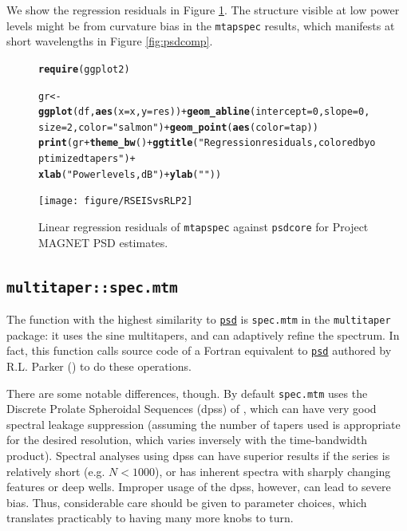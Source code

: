 \documentclass{article}\usepackage{graphicx, color}
\makeatletter
\newcommand{\hlfunctioncall}[1]{\textcolor[rgb]{0.501960784313725,0,0.329411764705882}{\textbf{#1}}}%
\newcommand{\hlstring}[1]{\textcolor[rgb]{0.6,0.6,1}{#1}}%
\newenvironment{kframe}{%
 \def\at@end@of@kframe{}%
 \ifinner\ifhmode%
  \def\at@end@of@kframe{\end{minipage}}%
  \begin{minipage}{\columnwidth}%
 \fi\fi%
 \def\FrameCommand##1{\hskip\@totalleftmargin \hskip-\fboxsep
 \colorbox{shadecolor}{##1}\hskip-\fboxsep
     \hskip-\linewidth \hskip-\@totalleftmargin \hskip\columnwidth}%
 \MakeFramed {\advance\hsize-\width
   \@totalleftmargin\z@ \linewidth\hsize
   \@setminipage}}%
 {\par\unskip\endMakeFramed%
 \at@end@of@kframe}
\newenvironment{knitrout}{}{} %
\newcommand{\Rcmd}[1]{\texttt{#1}}
\newcommand{\psd}[0]{\href{http://abarbour.github.com/psd/}{\color{blue}\Rcmd{psd}}}
\makeatother
\begin{document}
We show the regression residuals in Figure \ref{fig:psdreg}.  
The structure visible
at low power levels might be from curvature bias in
the \Rcmd{mtapspec} results, which
manifests at short wavelengths
in Figure \ref{fig:psdcomp}.

\begin{figure}[htb!]
\begin{center}
\begin{knitrout}
\color{fgcolor}\begin{kframe}
\begin{alltt}
\hlfunctioncall{require}(ggplot2)
\end{alltt}


{\ttfamily\noindent\itshape\color{messagecolor}{\#\# Loading required package: ggplot2}}\begin{alltt}
gr <- \hlfunctioncall{ggplot}(df, \hlfunctioncall{aes}(x = x, y = res)) + \hlfunctioncall{geom_abline}(intercept = 0, slope = 0, 
    size = 2, color = \hlstring{"salmon"}) + \hlfunctioncall{geom_point}(\hlfunctioncall{aes}(color = tap))
\hlfunctioncall{print}(gr + \hlfunctioncall{theme_bw}() + \hlfunctioncall{ggtitle}(\hlstring{"Regression residuals, colored by optimized tapers"}) + 
    \hlfunctioncall{xlab}(\hlstring{"Power levels, dB"}) + \hlfunctioncall{ylab}(\hlstring{""}))
\end{alltt}
\end{kframe}
\texttt{[image: figure/RSEISvsRLP2]} 

\end{knitrout}

\caption{Linear regression residuals of
\Rcmd{mtapspec} against \Rcmd{psdcore} for Project MAGNET PSD estimates.}
\label{fig:psdreg}
\end{center}
\end{figure}

\subsection{\Rcmd{multitaper::spec.mtm}}
The function with the highest similarity to \psd{} is
\Rcmd{spec.mtm} in the \Rcmd{multitaper} package: it uses
the sine multitapers, and can adaptively refine the spectrum.
In fact, this function
calls source code of a Fortran equivalent to \psd{}
authored by R.L. Parker (\citeyear{parkerweb}) to do these operations.

There are some notable differences, though.  
By default \Rcmd{spec.mtm}
 uses the Discrete Prolate Spheroidal Sequences (dpss) 
of \citet{thomson1982},
which can have very good spectral leakage suppression (assuming
the number of tapers used is appropriate for the 
desired resolution, which varies inversely with the time-bandwidth product).
Spectral analyses using dpss can have superior results if the series is
relatively short (e.g. $N < 1000$), or has inherent spectra
with sharply changing features or
deep wells.
Improper usage of the dpss, however, can lead to severe bias.
Thus, considerable care should be given to parameter choices, 
which translates practicably
to having many more knobs to turn.
\end{document}
